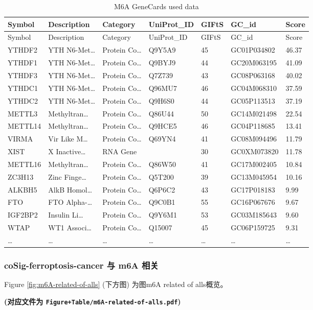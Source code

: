 \documentclass[
]{article}
\begin{document}
\begin{longtable}[]{@{}lllllll@{}}
\caption{\label{tab:M6A-GeneCards-used-data}M6A GeneCards used data}\tabularnewline
\toprule
Symbol & Description & Category & UniProt\_ID & GIFtS & GC\_id & Score\tabularnewline
\midrule
\endfirsthead
\toprule
Symbol & Description & Category & UniProt\_ID & GIFtS & GC\_id & Score\tabularnewline
\midrule
\endhead
YTHDF2 & YTH N6-Met\ldots{} & Protein Co\ldots{} & Q9Y5A9 & 45 & GC01P034802 & 46.37\tabularnewline
YTHDF1 & YTH N6-Met\ldots{} & Protein Co\ldots{} & Q9BYJ9 & 44 & GC20M063195 & 41.09\tabularnewline
YTHDF3 & YTH N6-Met\ldots{} & Protein Co\ldots{} & Q7Z739 & 43 & GC08P063168 & 40.02\tabularnewline
YTHDC1 & YTH N6-Met\ldots{} & Protein Co\ldots{} & Q96MU7 & 46 & GC04M068310 & 37.59\tabularnewline
YTHDC2 & YTH N6-Met\ldots{} & Protein Co\ldots{} & Q9H6S0 & 44 & GC05P113513 & 37.19\tabularnewline
METTL3 & Methyltran\ldots{} & Protein Co\ldots{} & Q86U44 & 50 & GC14M021498 & 22.54\tabularnewline
METTL14 & Methyltran\ldots{} & Protein Co\ldots{} & Q9HCE5 & 46 & GC04P118685 & 13.41\tabularnewline
VIRMA & Vir Like M\ldots{} & Protein Co\ldots{} & Q69YN4 & 41 & GC08M094496 & 11.79\tabularnewline
XIST & X Inactive\ldots{} & RNA Gene & & 30 & GC0XM073820 & 11.78\tabularnewline
METTL16 & Methyltran\ldots{} & Protein Co\ldots{} & Q86W50 & 41 & GC17M002405 & 10.84\tabularnewline
ZC3H13 & Zinc Finge\ldots{} & Protein Co\ldots{} & Q5T200 & 39 & GC13M045954 & 10.16\tabularnewline
ALKBH5 & AlkB Homol\ldots{} & Protein Co\ldots{} & Q6P6C2 & 43 & GC17P018183 & 9.99\tabularnewline
FTO & FTO Alpha-\ldots{} & Protein Co\ldots{} & Q9C0B1 & 55 & GC16P067676 & 9.67\tabularnewline
IGF2BP2 & Insulin Li\ldots{} & Protein Co\ldots{} & Q9Y6M1 & 53 & GC03M185643 & 9.60\tabularnewline
WTAP & WT1 Associ\ldots{} & Protein Co\ldots{} & Q15007 & 45 & GC06P159725 & 9.31\tabularnewline
\ldots{} & \ldots{} & \ldots{} & \ldots{} & \ldots{} & \ldots{} & \ldots{}\tabularnewline
\bottomrule
\end{longtable}

\hypertarget{cosig-ferroptosis-cancer-ux4e0e-m6a-ux76f8ux5173}{%
\subsubsection{coSig-ferroptosis-cancer 与 m6A 相关}\label{cosig-ferroptosis-cancer-ux4e0e-m6a-ux76f8ux5173}}

Figure \ref{fig:m6A-related-of-alls} (下方图) 为图m6A related of alls概览。

\textbf{(对应文件为 \texttt{Figure+Table/m6A-related-of-alls.pdf})}
\end{document}
